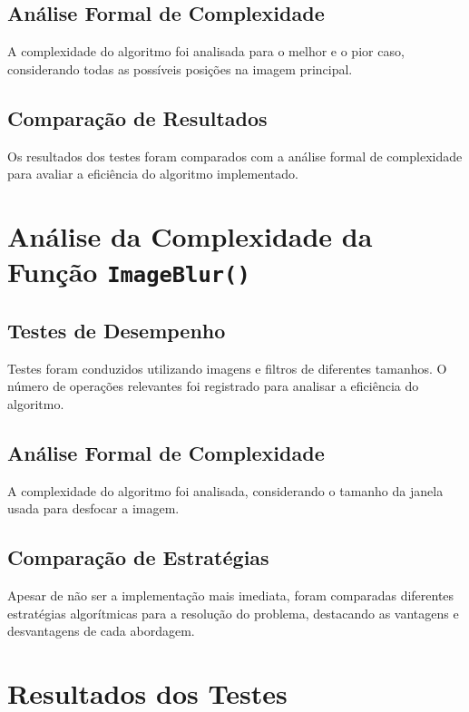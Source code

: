 \documentclass{article}
\begin{document}
\subsection{Análise Formal de Complexidade}
A complexidade do algoritmo foi analisada para o melhor e o pior caso, considerando todas as possíveis posições na imagem principal.

\subsection{Comparação de Resultados}
Os resultados dos testes foram comparados com a análise formal de complexidade para avaliar a eficiência do algoritmo implementado.

\section{Análise da Complexidade da Função \texttt{ImageBlur()}}

\subsection{Testes de Desempenho}
Testes foram conduzidos utilizando imagens e filtros de diferentes tamanhos. O número de operações relevantes foi registrado para analisar a eficiência do algoritmo.

\subsection{Análise Formal de Complexidade}
A complexidade do algoritmo foi analisada, considerando o tamanho da janela usada para desfocar a imagem.

\subsection{Comparação de Estratégias}
Apesar de não ser a implementação mais imediata, foram comparadas diferentes estratégias algorítmicas para a resolução do problema, destacando as vantagens e desvantagens de cada abordagem.

\section{Resultados dos Testes}
\end{document}
